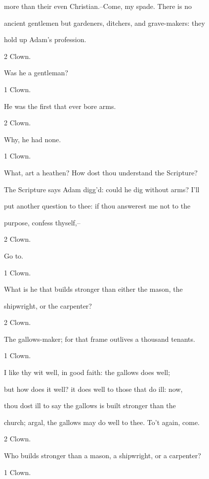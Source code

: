 \documentclass[12pt]{book}
\begin{document}
more than their even Christian.--Come, my spade. There is no

ancient gentlemen but gardeners, ditchers, and grave-makers: they

hold up Adam's profession.



2 Clown.

Was he a gentleman?



1 Clown.

He was the first that ever bore arms.



2 Clown.

Why, he had none.



1 Clown.

What, art a heathen? How dost thou understand the Scripture?

The Scripture says Adam digg'd: could he dig without arms? I'll

put another question to thee: if thou answerest me not to the

purpose, confess thyself,--



2 Clown.

Go to.



1 Clown.

What is he that builds stronger than either the mason, the

shipwright, or the carpenter?



2 Clown.

The gallows-maker; for that frame outlives a thousand tenants.



1 Clown.

I like thy wit well, in good faith: the gallows does well;

but how does it well? it does well to those that do ill: now,

thou dost ill to say the gallows is built stronger than the

church; argal, the gallows may do well to thee. To't again, come.



2 Clown.

Who builds stronger than a mason, a shipwright, or a carpenter?



1 Clown.
\end{document}

